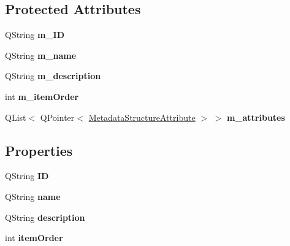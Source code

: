 \subsection*{Protected Attributes}
\begin{DoxyCompactItemize}
\item 
\mbox{\label{class_metadata_structure_section_a05e8adaa3e9cfc684afe183860fa33f2}} 
Q\+String {\bfseries m\+\_\+\+ID}
\item 
\mbox{\label{class_metadata_structure_section_a4b1ef290d60172118648904c8c669432}} 
Q\+String {\bfseries m\+\_\+name}
\item 
\mbox{\label{class_metadata_structure_section_a52716268a4675d2e018da64c01c0f302}} 
Q\+String {\bfseries m\+\_\+description}
\item 
\mbox{\label{class_metadata_structure_section_aa55adb25b015d75b7d092811005f7930}} 
int {\bfseries m\+\_\+item\+Order}
\item 
\mbox{\label{class_metadata_structure_section_ab42688fd5ff90c130cb95a7baeaa975b}} 
Q\+List$<$ Q\+Pointer$<$ \hyperlink{class_metadata_structure_attribute}{Metadata\+Structure\+Attribute} $>$ $>$ {\bfseries m\+\_\+attributes}
\end{DoxyCompactItemize}
\subsection*{Properties}
\begin{DoxyCompactItemize}
\item 
\mbox{\label{class_metadata_structure_section_aab1747d66f623058650fe857047879fd}} 
Q\+String {\bfseries ID}
\item 
\mbox{\label{class_metadata_structure_section_a97363217c0d043a41d5bd36210cd2725}} 
Q\+String {\bfseries name}
\item 
\mbox{\label{class_metadata_structure_section_ac572cd30623cfc11309a1b1ab211ad4f}} 
Q\+String {\bfseries description}
\item 
\mbox{\label{class_metadata_structure_section_a7ae45ab7e6cd4eda1cc38fc4261262d4}} 
int {\bfseries item\+Order}
\end{DoxyCompactItemize}


